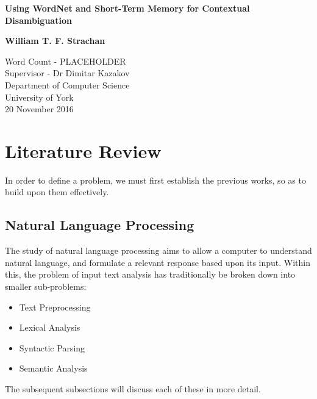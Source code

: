 \documentclass[twocolumn]{article}
\begin{document}
\begin{titlepage}
    \begin{center}
        \vspace*{1cm}
        
        \Huge
        \textbf{Using WordNet and Short-Term Memory for Contextual Disambiguation}
        \vspace{2cm}
        
        \Large
        \textbf{William T. F. Strachan}
        
        \vfill
                
        \vspace{0.8cm}
        
        \Large
        Word Count - PLACEHOLDER\\
        Supervisor - Dr Dimitar Kazakov\\
        Department of Computer Science\\
        University of York\\
        20 November 2016
        
    \end{center}
\end{titlepage}


\section{Literature Review}
\label{sec:LitReview}
In order to define a problem, we must first establish the previous works, so as to build upon them effectively. 


\subsection{Natural Language Processing}
\label{sec:NLP}
The study of natural language processing aims to allow a computer to understand natural language, and formulate a relevant response based upon its input. Within this, the problem of input text analysis has traditionally be broken down into smaller sub-problems\cite{NLPHandbook}:
\begin{itemize}
	\item Text Preprocessing
	\item Lexical Analysis
	\item Syntactic Parsing
	\item Semantic Analysis
\end{itemize}
The subsequent subsections will discuss each of these in more detail.
\end{document}
